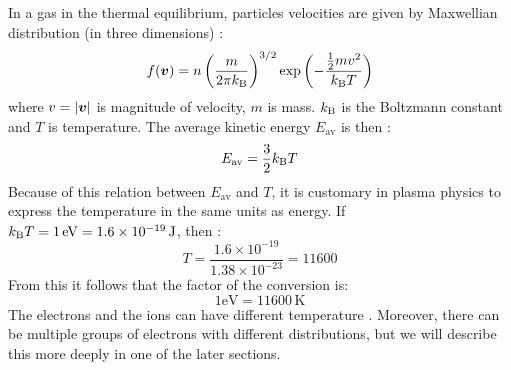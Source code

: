 In a gas in the thermal equilibrium, particles velocities are given by Maxwellian distribution (in three dimensions) \cite{plasma-intro3}:
\begin{equation}
	f(\bm{v}) = n\left(\frac{m}{2\pi k_\mathrm{B}}\right)^{3/2}\exp\left(-\frac{\frac{1}{2}m v^2}{k_\mathrm{B} T}\right)
\end{equation} 
\noindent where $v = \lvert \bm{v} \rvert$ is magnitude of velocity, $m$ is mass. $k_\mathrm{B}$ is the Boltzmann constant and $T$ is temperature. The average kinetic energy $E_{\mathrm{av}}$ is then \cite{plasma-intro3}:
\begin{equation}
	E_{\mathrm{av}}=\frac{3}{2}k_\mathrm{B} T
\end{equation}
Because of this relation between $E_{\mathrm{av}}$ and $T$, it is customary in plasma physics to express the temperature in the same units as energy. If $k_\mathrm{B} T = 1 \, \mathrm{eV} = 1.6 \times 10^{-19}\, \mathrm{J}$, then \cite{plasma-intro3}:
\begin{equation}
	T = \frac{1.6 \times 10^{-19}}{1.38\times 10^{-23}}=11600
\end{equation}
\noindent From this it follows that the factor of the conversion is:
\begin{equation}
	1 \mathrm{eV} = 11600\,\mathrm{K}
\end{equation} 
The electrons and the ions can have different temperature \cite{plasma-intro3}. Moreover, there can be multiple groups of electrons with different distributions, but we will describe this more deeply in one of the later sections.

